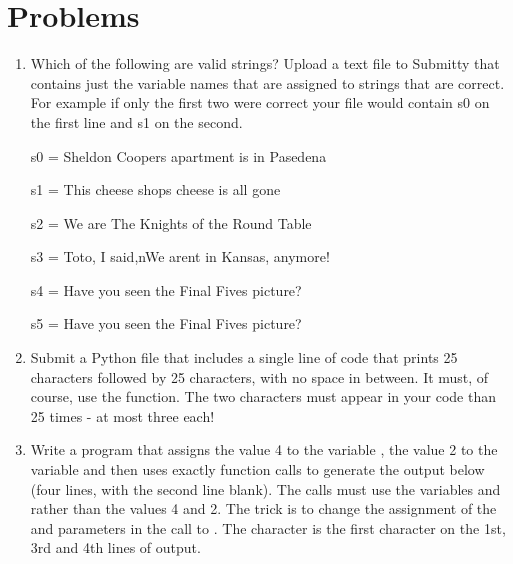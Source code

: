 \documentclass[letterpaper,10pt,english]{sphinxmanual}
\begin{document}
\section{Problems}
\label{\detokenize{lecture_notes/lec03_strings_exercises/exercises:problems}}\begin{enumerate}
\item {} 
Which of the following are valid strings?  Upload a text file to
Submitty that contains just the variable names that are assigned to
strings that are correct.  For example if only the first two were
correct your file would contain s0 on the first line and s1 on the
second.

%
\begin{sphinxVerbatim}[commandchars=\\\{\}]
\PYGZgt{}\PYGZgt{}\PYGZgt{} s0 = \PYGZdq{}Sheldon Cooper\PYGZsq{}s apartment is in Pasedena\PYGZdq{}

\PYGZgt{}\PYGZgt{}\PYGZgt{} s1 = \PYGZsq{}This cheese shop\PYGZsq{}s cheese is all gone\PYGZdq{}

\PYGZgt{}\PYGZgt{}\PYGZgt{} s2 = \PYGZdq{}\PYGZdq{}\PYGZdq{}We are
\PYGZdq{}The Knights of the Round Table\PYGZdq{}
\PYGZdq{}\PYGZdq{}\PYGZdq{}

\PYGZgt{}\PYGZgt{}\PYGZgt{} s3 = \PYGZdq{}Toto, I said,\PYGZbs{}n\PYGZdq{}We aren\PYGZsq{}t in Kansas, anymore!\PYGZdq{}


\PYGZgt{}\PYGZgt{}\PYGZgt{} s4 = \PYGZsq{}Have you seen the \PYGZdq{}Final Five\PYGZdq{}\PYGZsq{}s picture?\PYGZsq{}


\PYGZgt{}\PYGZgt{}\PYGZgt{} s5 = \PYGZdq{}Have you seen the \PYGZsq{}Final Five\PYGZsq{}\PYGZsq{}s picture?\PYGZdq{}
\end{sphinxVerbatim}

\item {} 
Submit a Python file that includes a single line of code that prints
25  characters followed by 25  characters, with no
space in between.  It must, of course, use the  function.
The two characters must appear in your code  than 25
times - at most three each!

\item {} 
Write a program that assigns the value 4 to the variable , the
value 2 to the variable  and then uses exactly 
 function calls to generate the output below (four lines,
with the second line blank).  The  calls must use the
variables  and  rather than the values 4 and 2.  The
trick is to change the assignment of the  and 
parameters in the call to .  The character  is the
first character on the 1st, 3rd and 4th lines of output.

\end{enumerate}
\end{document}
